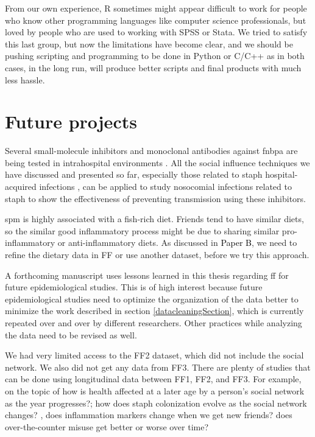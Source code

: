 From our own experience, R sometimes might appear difficult to work for people who know other programming languages like computer science professionals, but loved by people who are used to working with SPSS or Stata. We tried to satisfy this last group, but now the limitations have become clear, and we should be pushing scripting and programming to be done in Python or C/C++ as in both cases, in the long run, will produce better scripts and final products with much less hassle.

\section{Future projects}

Several small-molecule inhibitors and monoclonal antibodies against \gls{fnbpa} \cite{Gries2020, Provenza2010} are being tested in intrahospital environments \cite{Zimmerli2014}. All the social influence techniques we have discussed and presented so far, especially those related to \gls{staph} hospital-acquired infections \cite{Denis2017, Solberg2000}, can be applied to study nosocomial infections related to \gls{staph} to show the effectiveness of preventing transmission using these inhibitors.

\gls{spm} is highly associated with a fish-rich diet. Friends tend to have similar diets, so the similar good inflammatory process might be due to sharing similar pro-inflammatory or anti-inflammatory diets. As discussed in \colorbox{PaperColor}{\textcolor{black}{Paper B}}, we need to refine the dietary data in FF or use another dataset, before we try this approach.

A forthcoming manuscript uses lessons learned in this thesis regarding \gls{ff} for future epidemiological studies. This is of high interest because future epidemiological studies need to optimize the organization of the data better to minimize the work described in section \ref{datacleaningSection}, which is currently repeated over and over by different researchers. Other practices while analyzing the data need to be revised as well.

We had very limited access to the FF2 dataset, which did not include the social network. We also did not get any data from FF3. There are plenty of studies that can be done using longitudinal data between FF1, FF2, and FF3. For example, on the topic of how is health affected at a later age by a person's social network as the year progresses?; how does \gls{staph} colonization evolve as the social network changes? , does inflammation markers change when we get new friends? does over-the-counter misuse get better or worse over time?


